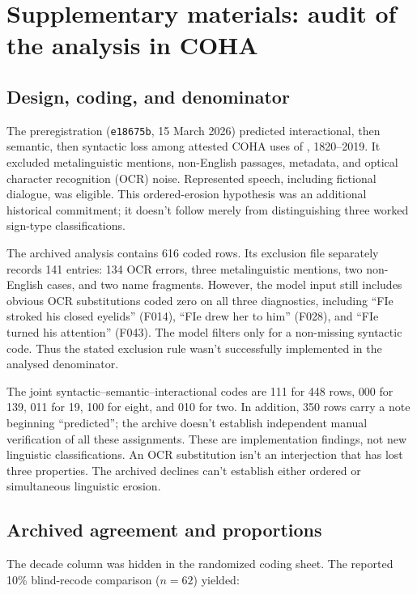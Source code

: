 \documentclass[12pt]{article}
\begin{document}
\section[Fie in COHA]{Supplementary materials: audit of the  analysis in COHA}
\label{app:fie}

\subsection{Design, coding, and denominator}

The preregistration (\texttt{e18675b}, 15 March 2026) predicted interactional, then semantic, then syntactic loss among attested COHA uses of , 1820--2019. It excluded metalinguistic mentions, non-English passages, metadata, and optical character recognition (OCR) noise. Represented speech, including fictional dialogue, was eligible. This ordered-erosion hypothesis was an additional historical commitment; it doesn't follow merely from distinguishing three worked sign-type classifications.

The archived analysis contains 616 coded rows. Its exclusion file separately records 141 entries: 134 OCR errors, three metalinguistic mentions, two non-English cases, and two name fragments. However, the model input still includes obvious OCR substitutions coded zero on all three diagnostics, including \enquote{FIe stroked his closed eyelids} (F014), \enquote{FIe drew her to him} (F028), and \enquote{FIe turned his attention} (F043). The model filters only for a non-missing syntactic code. Thus the stated exclusion rule wasn't successfully implemented in the analysed denominator.

The joint syntactic--semantic--interactional codes are 111 for 448 rows, 000 for 139, 011 for 19, 100 for eight, and 010 for two. In addition, 350 rows carry a note beginning \enquote{predicted}; the archive doesn't establish independent manual verification of all these assignments. These are implementation findings, not new linguistic classifications. An OCR substitution isn't an interjection that has lost three properties. The archived declines can't establish either ordered or simultaneous linguistic erosion.

\subsection{Archived agreement and proportions}

The decade column was hidden in the randomized coding sheet. The reported 10\% blind-recode comparison ($n = 62$) yielded:
\end{document}
